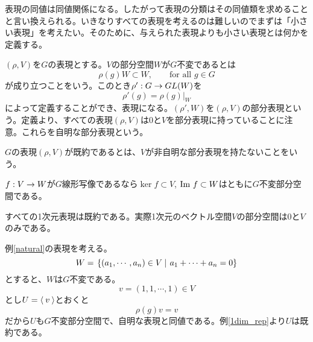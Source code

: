 \documentclass{ltjsreport}
\begin{document}
表現の同値は同値関係になる。したがって表現の分類はその同値類を求めることと言い換えられる。いきなりすべての表現を考えるのは難しいのでまずは「小さい表現」を考えたい。そのために、与えられた表現よりも小さい表現とは何かを定義する。

\begin{defin}
  $(\rho,V)$を$G$の表現とする。$V$の部分空間$W$が$G$不変であるとは
  \[
  \rho(g)W\subset W,\qquad \text{for all $g\in G$}  
  \]
  が成り立つことをいう。このとき$\rho':G\rightarrow GL(W)$を
  \[
  \rho'(g)=\rho(g)|_W  
  \]
  によって定義することができ、表現になる。$(\rho',W)$を$(\rho, V)$の部分表現という。定義より、すべての表現$(\rho, V)$は$0$と$V$を部分表現に持っていることに注意。これらを自明な部分表現という。
\end{defin}

\begin{defin}
  $G$の表現$(\rho, V)$が既約であるとは、$V$が非自明な部分表現を持たないことをいう。
\end{defin}

\begin{eg}\label{ker_im}
  $f:V\rightarrow W$が$G$線形写像であるなら$\ker f\subset V$, $\text{Im } f\subset W$はともに$G$不変部分空間である。
\end{eg}

\begin{eg}\label{1dim_rep}
  すべての1次元表現は既約である。実際1次元のベクトル空間$V$の部分空間は$0$と$V$のみである。
\end{eg}

\begin{eg}
  例\ref{natural}の表現を考える。
  \[
  W=\left.\left\{(a_1,\cdots,a_n)\in V \: \right| \: a_1+\cdots+a_n=0\right\}  
  \]
  とすると、$W$は$G$不変である。
  \[
  v=(1,1,\cdots,1)\in V  
  \]
  とし$U=\langle\:v\:\rangle$とおくと
  \[
  \rho(g)v=v  
  \]
  だから$U$も$G$不変部分空間で、自明な表現と同値である。例\ref{1dim_rep}より$U$は既約である。
\end{eg}
\end{document}
